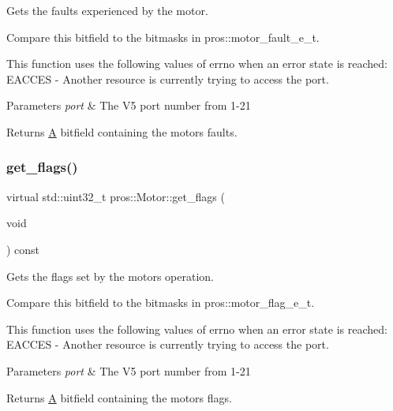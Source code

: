 Gets the faults experienced by the motor. 

Compare this bitfield to the bitmasks in pros\+::motor\+\_\+fault\+\_\+e\+\_\+t.

This function uses the following values of errno when an error state is reached\+: E\+A\+C\+C\+ES -\/ Another resource is currently trying to access the port.


\begin{DoxyParams}{Parameters}
{\em port} & The V5 port number from 1-\/21\\
\hline
\end{DoxyParams}
\begin{DoxyReturn}{Returns}
\mbox{\hyperlink{structA}{A}} bitfield containing the motor\textquotesingle{}s faults. 
\end{DoxyReturn}
\mbox{\label{classpros_1_1Motor_a7e24aa1c4363a131829e902f12e7364c}} 
\subsubsection{\texorpdfstring{get\_flags()}{get\_flags()}}
{\footnotesize\ttfamily virtual std\+::uint32\+\_\+t pros\+::\+Motor\+::get\+\_\+flags (\begin{DoxyParamCaption}\item[{void}]{ }\end{DoxyParamCaption}) const\hspace{0.3cm}{\ttfamily [virtual]}}



Gets the flags set by the motor\textquotesingle{}s operation. 

Compare this bitfield to the bitmasks in pros\+::motor\+\_\+flag\+\_\+e\+\_\+t.

This function uses the following values of errno when an error state is reached\+: E\+A\+C\+C\+ES -\/ Another resource is currently trying to access the port.


\begin{DoxyParams}{Parameters}
{\em port} & The V5 port number from 1-\/21\\
\hline
\end{DoxyParams}
\begin{DoxyReturn}{Returns}
\mbox{\hyperlink{structA}{A}} bitfield containing the motor\textquotesingle{}s flags. 
\end{DoxyReturn}
\mbox{\label{classpros_1_1Motor_a3227bc4fbe531638472fff4dfb134333}} 
